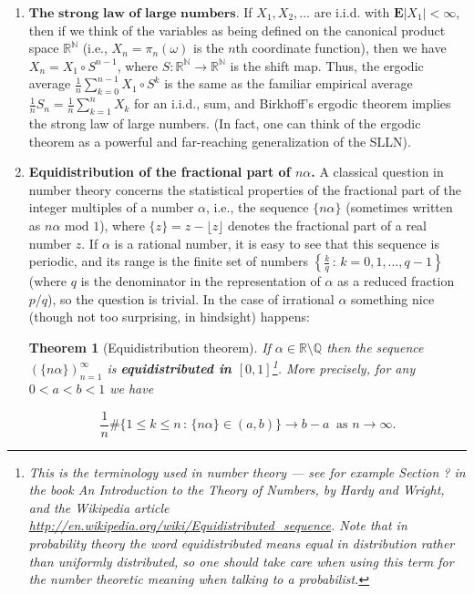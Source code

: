 \documentclass[11pt]{report}
\newcommand{\R}{\mathbb{R}}
\newcommand{\N}{\mathbb{N}}
\theoremstyle{plain}
\newtheorem{thm}{Theorem}[chapter]
\theoremstyle{definition}
\begin{document}
\begin{enumerate}[label=\arabic*.]
\item $\textbf{The strong law of large numbers.}$ If
$X_1,X_2,\ldots$ are i.i.d. with
$\mathbf{E}|X_1|<\infty$, then if we think of the
variables as being defined on the canonical product
space $\R^\N$ (i.e., $X_n=\pi_n(\omega)$ is the $n$th
coordinate function), then we have
$X_n = X_1\circ S^{n-1}$, where $S:\R^\N\to\R^\N$ is
the shift map. Thus, the ergodic average
$\frac{1}{n} \sum_{k=0}^{n-1} X_1\circ S^k$ is the
same as the familiar empirical average
$\frac{1}{n} S_n = \frac{1}{n} \sum_{k=1}^n X_k$ for
an i.i.d., sum, and Birkhoff's ergodic theorem implies
the strong law of large numbers. (In fact, one can
think of the ergodic theorem as a powerful and
far-reaching generalization of the SLLN).

\item \textbf{Equidistribution of the fractional part of
$n\alpha$.} A classical question in number theory
concerns the statistical properties of the fractional
part of the integer multiples of a number $\alpha$,
i.e., the sequence $\{n \alpha \}$ (sometimes written
as $n\alpha \textrm{ mod }1$), where
$\{z\}=z-\lfloor z\rfloor$ denotes the fractional
part of a real number $z$. If $\alpha$ is a rational
number, it is easy to see that this sequence is
periodic, and its range is the finite set of numbers
$\left\{ \frac{k}{q}\,:\, k=0,1,\ldots,q-1 \right\}$
(where $q$ is the denominator in the representation
of $\alpha$ as a reduced fraction $p/q$), so the
question is trivial. In the case of irrational
$\alpha$ something nice (though not too surprising,
in hindsight) happens:

\begin{thm}[Equidistribution theorem]
\label{thm-equidistribution}
If $\alpha\in \R\setminus\mathbb{Q}$ then the
sequence $( \{ n\alpha \} )_{n=1}^\infty$ is
\textbf{equidistributed in $[0,1]$}\footnote{This is the terminology used in number theory --- see
for example Section ? in the book \emph{An Introduction to
the Theory of Numbers}, by Hardy and Wright, and the
Wikipedia article
\href{http://en.wikipedia.org/wiki/Equidistributed_sequence}{http://en.wikipedia.org/wiki/Equidistributed\_sequence}.
Note that in probability theory the word
\emph{equidistributed} means equal in distribution rather
than uniformly distributed, so one should take care
when using this term for the number theoretic meaning
when talking to a probabilist.}.
More precisely, for any $0<a<b<1$ we have

\[
\frac{1}{n} \# \Big\{ 1\le k\le n\,:\, \{n\alpha\}\in (a,b) \Big\} \to b-a\ \textrm{ as }n\to\infty.
\]


\end{thm}
\end{enumerate}
\end{document}
